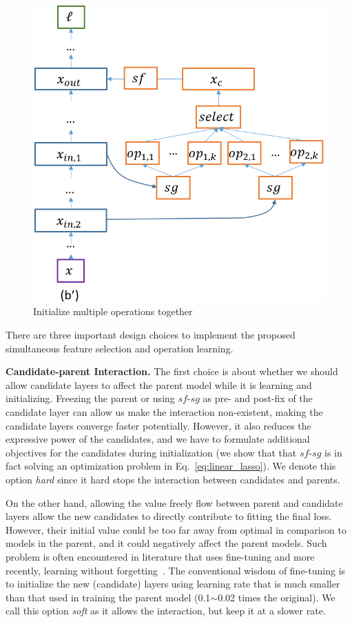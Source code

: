 \documentclass{article}
\begin{document}
\begin{figure}[t]
    \centering
    \includegraphics[width=0.8\linewidth, keepaspectratio]{img/hallu_choice.png}
    \caption{Initialize multiple operations together }
    \label{fig:hallu_choice}
\end{figure}

There are three important design choices to implement the proposed simultaneous feature selection and operation learning. 

\textbf{Candidate-parent Interaction.} 
The first choice is about whether we should allow candidate layers to affect the parent model while it is learning and initializing. 
Freezing the parent or using $sf$-$sg$ as pre- and post-fix of the candidate layer can allow us make the interaction non-existent, making the candidate layers converge faster potentially. However, it also reduces the expressive power of the candidates, and we have to formulate additional objectives for the candidates during initialization (we  show that that $sf$-$sg$ is in fact solving an optimization problem in Eq.~\ref{eq:linear_lasso}). We denote this option \textit{hard} since it hard stops the interaction between candidates and parents.

On the other hand, allowing the value freely flow between parent and candidate layers allow the new candidates to directly contribute to fitting the final loss. However, their initial value could be too far away from optimal in comparison to models in the parent, and it could negatively affect the parent models. Such problem is often encountered in literature that uses fine-tuning and more recently, learning without forgetting~\citep{}. The conventional wisdom of fine-tuning is to initialize the new (candidate) layers using learning rate that is much smaller than that used in training the parent model (0.1$\sim$0.02 times the original). We call this option \textit{soft} as it allows the interaction, but keep it at a slower rate. 
\end{document}
